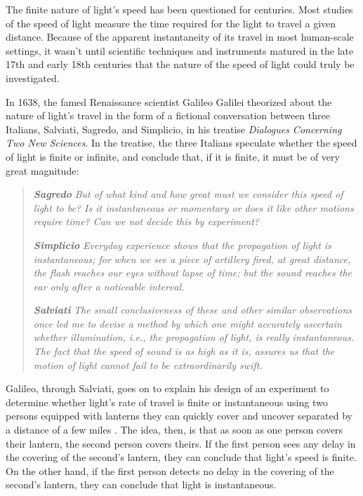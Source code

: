 \documentclass[twocolumn]{article}
\begin{document}
		The finite nature of light's speed has been questioned for centuries. 
		Most studies of the speed of light measure the time required for the light to travel a given distance. 
		Because of the apparent instantaneity of its travel in most human-scale settings, it wasn’t until scientific techniques and instruments matured in the late 17th and early 18th centuries that the nature of the speed of light could truly be investigated. 
		
		In 1638, the famed Renaissance scientist Galileo Galilei theorized about the nature of light's travel in the form of a fictional conversation between three Italians, Salviati, Sagredo, and Simplicio, in his treatise \textit{Dialogues Concerning Two New Sciences}.\cite{galilei_dialogues_1638}
		In the treatise, the three Italians speculate whether the speed of light is finite or infinite, and conclude that, if it is finite, it must be of very great magnitude:
		
		\begin{quotation}
			\noindent
			\textit{\textbf{Sagredo}} \newline 
			\textit{But of what kind and how great must we consider this speed of light to be? 
			Is it instantaneous or momentary or does it like other motions require time? 
			Can we not decide this by experiment?}
			
			\noindent \newline
			\textit{\textbf{Simplicio}} \newline 
			\textit{Everyday experience shows that the propagation of light is instantaneous; for when we see a piece of artillery fired, at great distance, the flash reaches our eyes without lapse of time; but the sound reaches the ear only after a noticeable interval.}
			
			
			\noindent \newline
			\textit{\textbf{Salviati}} \newline
			\textit{The small conclusiveness of these and other similar observations once led me to
			devise a method by which one might accurately ascertain whether illumination, i.e., the propagation of light, is really instantaneous. The fact that the speed of sound is as high as it is, assures us that the motion of light cannot fail to be extraordinarily swift.}
		\end{quotation}
		
		Galileo, through Salviati, goes on to explain his design of an experiment to determine whether light's rate of travel is finite or instantaneous using two persons equipped with lanterns they can quickly cover and uncover separated by a distance of a few miles . 
		The idea, then, is that as soon as one person covers their lantern, the second person covers theirs. 
		If the first person sees any delay in the covering of the second's lantern, they can conclude that light's speed is finite. 
		On the other hand, if the first person detects no delay in the covering of the second's lantern, they can conclude that light is instantaneous.
		
\end{document}
